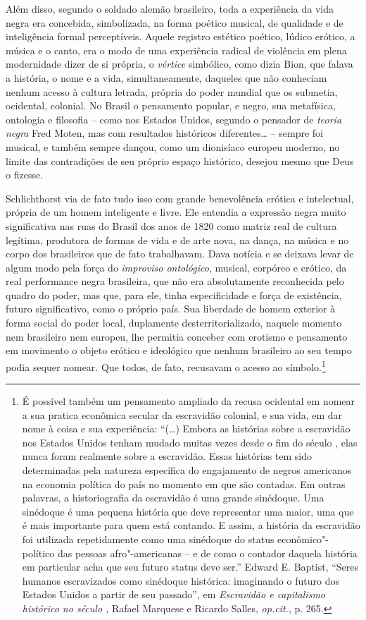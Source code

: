 Além disso, segundo o soldado alemão brasileiro, toda a experiência da
vida negra era concebida, simbolizada, na forma poético musical, de
qualidade e de inteligência formal perceptíveis. Aquele registro
estético poético, lúdico erótico, a música e o canto, era o modo de uma
experiência radical de violência em plena modernidade dizer de si
própria, o \emph{vértice} simbólico, como dizia Bion, que falava a
história, o nome e a vida, simultaneamente, daqueles que não conheciam
nenhum acesso à cultura letrada, própria do poder mundial que os
submetia, ocidental, colonial. No Brasil o pensamento popular, e negro,
sua metafísica, ontologia e filosofia -- como nos Estados Unidos,
segundo o pensador de \emph{teoria negra} Fred Moten, mas com resultados
históricos diferentes\ldots{} -- sempre foi musical, e também sempre dançou,
como um dionisíaco europeu moderno, no limite das contradições de seu
próprio espaço histórico, desejou mesmo que Deus o fizesse.

Schlichthorst via de fato tudo isso com grande benevolência erótica e
intelectual, própria de um homem inteligente e livre. Ele entendia a
expressão negra muito significativa nas ruas do Brasil dos anos de 1820
como matriz real de cultura legítima, produtora de formas de vida e de
arte nova, na dança, na música e no corpo dos brasileiros que de fato
trabalhavam. Dava notícia e se deixava levar de algum modo pela força do
\emph{improviso ontológico}, musical, corpóreo e erótico, da real
performance negra brasileira, que não era absolutamente reconhecida pelo
quadro do poder, mas que, para ele, tinha especificidade e força de
existência, futuro significativo, como o próprio país. Sua liberdade de
homem exterior à forma social do poder local, duplamente
desterritorializado, naquele momento nem brasileiro nem europeu, lhe
permitia conceber com erotismo e pensamento em movimento o objeto
erótico e ideológico que nenhum brasileiro ao seu tempo podia sequer
nomear. Que todos, de fato, recusavam o acesso ao símbolo.\footnote{É
  possível também um pensamento ampliado da recusa ocidental em nomear a
  sua pratica econômica secular da escravidão colonial, e sua vida, em
  dar nome à coisa e sua experiência: ``(\ldots{}) Embora as histórias sobre
  a escravidão nos Estados Unidos tenham mudado muitas vezes desde o fim
  do século , elas nunca foram realmente sobre a escravidão. Essas
  histórias tem sido determinadas pela natureza específica do
  engajamento de negros americanos na economia política do país no
  momento em que são contadas. Em outras palavras, a historiografia da
  escravidão é uma grande sinédoque. Uma sinédoque é uma pequena
  história que deve representar uma maior, uma que é mais importante
  para quem está contando. E assim, a história da escravidão foi
  utilizada repetidamente como uma sinédoque do status
  econômico"-político das pessoas afro"-americanas -- e de como o contador
  daquela história em particular acha que seu futuro status deve ser.''
  Edward E. Baptist, ``Seres humanos escravizados como sinédoque
  histórica: imaginando o futuro dos Estados Unidos a partir de seu
  passado'', em \emph{Escravidão e capitalismo histórico no século ,}
  Rafael Marquese e Ricardo Salles, \emph{op.cit.}, p. 265.}

